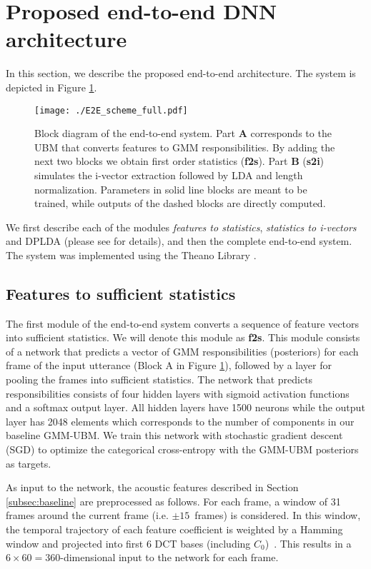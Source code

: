 \documentclass{article}
\begin{document}
\section{Proposed end-to-end DNN architecture}
In this section, we describe the proposed end-to-end architecture. The system is depicted in Figure  \ref{fig:scheme}.  
\begin{figure}[t!]
\centering\texttt{[image: ./E2E\_scheme\_full.pdf]}
\caption{Block diagram of the end-to-end system. Part {\bf A} corresponds to the UBM that converts features to GMM responsibilities. By adding the next two blocks we obtain first order statistics ({\bf f2s}). Part {\bf B} ({\bf s2i}) simulates the i-vector extraction followed by LDA and length normalization. Parameters in solid line blocks are meant to be trained, while outputs of the dashed blocks are directly computed.}
\label{fig:scheme}
\end{figure}
We first describe each of the modules \emph{features to statistics}, \emph{statistics to i-vectors} and DPLDA (please see  \cite{arXiv_2017} for details), and then the complete end-to-end system. The system was implemented using the Theano Library \cite{Theano_2016}.
\subsection{Features to sufficient statistics}
\label{f2s_sec}
The first module of the end-to-end system converts a sequence of feature vectors into sufficient statistics. We will denote this module as {\bf f2s}. This module consists of a network that predicts a vector of GMM responsibilities (posteriors) for each frame of the input utterance (Block A in Figure \ref{fig:scheme}), followed by a layer for pooling the frames into sufficient statistics. The network that predicts responsibilities consists of four hidden layers with sigmoid activation functions and a softmax output layer. All hidden layers have 1500 neurons while the output layer has 2048 elements which corresponds to the number of components in our baseline GMM-UBM.  We train this network with stochastic gradient descent (SGD) to optimize the categorical cross-entropy with the GMM-UBM posteriors as targets.

As input to the network, the acoustic features described in Section \ref{subsec:baseline} are preprocessed as follows. For each frame, a window of 31 frames around the current frame (i.e. $\pm15\,$ frames) is considered. In this window, the temporal trajectory of each feature coefficient is weighted by a Hamming window and projected into first 6 DCT bases (including $C_0$)~\cite{BUT_babel2014}. This results in a $6\times60=360$-dimensional input to the network for each frame.
\end{document}
